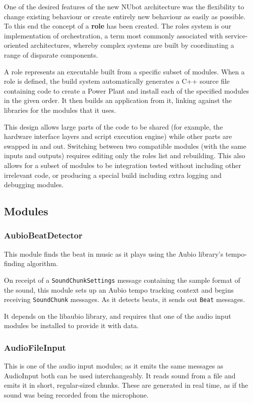 \documentclass[english,12pt]{scrartcl}
\begin{document}
			One of the desired features of the new NUbot architecture was the flexibility to
			change existing behaviour or create entirely new behaviour as easily as possible. To
			this end the concept of a \textbf{role} has been created. The roles system is our
			implementation of orchestration, a term most commonly associated with service-oriented
			architectures, whereby complex systems are built by coordinating a range of disparate
			components.
			
			A role represents an executable built from a specific subset of modules. When a role
			is defined, the build system automatically generates a C++ source file containing code
			to create a Power Plant and install each of the specified modules in the given order.
			It then builds an application from it, linking against the libraries for the modules
			that it uses.
			
			This design allows large parts of the code to be shared (for example, the hardware
			interface layers and script execution engine) while other parts are swapped in and
			out. Switching between two compatible modules (with the same inputs and outputs)
			requires editing only the roles list and rebuilding. This also allows for a subset of
			modules to be integration tested without including other irrelevant code, or
			producing a special build including extra logging and debugging modules.
			
		
		\subsection{Modules}

			\subsubsection{AubioBeatDetector}
				This module finds the beat in music as it plays using the Aubio library's
				tempo-finding algorithm.
				
				On receipt of a \texttt{SoundChunkSettings} message containing the sample format
				of the sound, this module sets up an Aubio tempo tracking context and begins
				receiving \texttt{SoundChunk} messages. As it detects beats, it sends out
				\texttt{Beat} messages.
				
				It depends on the libaubio library, and requires that one of the audio input
				modules be installed to provide it with data.
			
			
			\subsubsection{AudioFileInput}
				This is one of the audio input modules; as it emits the same messages as
				AudioInput both can be used interchangeably. It reads sound from a file and emits
				it in short, regular-sized chunks. These are generated in real time, as if the
				sound was being recorded from the microphone.
				
\end{document}
